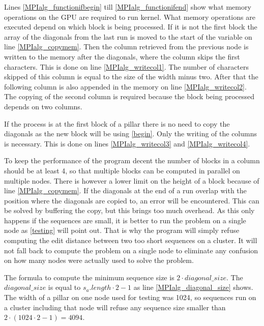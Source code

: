 Lines \ref{MPIalg_functionifbegin} till \ref{MPIalg_functionifend} show what memory operations on the GPU are required to run kernel.
What memory operations are executed depend on which block is being processed.
If it is not the first block the array of the diagonals from the last run is moved to the start of the variable on line \ref{MPIalg_copymem}.
Then the column retrieved from the previous node is written to the memory after the diagonals, where the column skips the first characters.
This is done on line \ref{MPIalg_writecol1}.
The number of characters skipped of this column is equal to the size of the width minus two.
After that the following column is also appended in the memory on line \ref{MPIalg_writecol2}.
The copying of the second column is required because the block being processed depends on two columns.

If the process is at the first block of a pillar there is no need to copy the diagonals as the new block will be using \cref{begin}.
Only the writing of the columns is necessary.
This is done on lines \ref{MPIalg_writecol3} and \ref{MPIalg_writecol4}.

To keep the performance of the program decent the number of blocks in a column should be at least 4, so that multiple blocks can be computed in parallel on multiple nodes.
There is however a lower limit on the height of a block because of line \ref{MPIalg_copymem}.
If the diagonals at the end of a run overlap with the position where the diagonals are copied to, an error will be encountered.
This can be solved by buffering the copy, but this brings too much overhead.
As this only happens if the sequences are small, it is better to run the problem on a single node as \cref{testing} will point out.
That is why the program will simply refuse computing the edit distance between two too short sequences on a cluster.
It will not fall back to compute the problem on a single node to eliminate any confusion on how many nodes were actually used to solve the problem.

The formula to compute the minimum sequence size is $2 \cdot diagonal\_size$.
The $diagonal\_size$ is equal to $s_a.length \cdot 2 - 1$ as line \ref{MPIalg_diagonal_size} shows.
The width of a pillar on one node used for testing was 1024, so sequences run on a cluster including that node will refuse any sequence size smaller than $2 \cdot (1024 \cdot 2 - 1) = 4094$.
